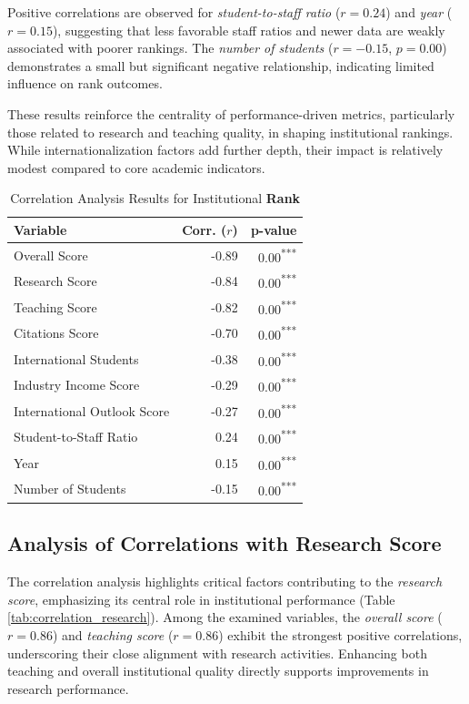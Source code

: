 \documentclass[sigconf]{acmart}
\begin{document}
Positive correlations are observed for \textit{student-to-staff ratio} ($r = 0.24$) and \textit{year} ($r = 0.15$), suggesting that less favorable staff ratios and newer data are weakly associated with poorer rankings. The \textit{number of students} ($r = -0.15$, $p = 0.00$) demonstrates a small but significant negative relationship, indicating limited influence on rank outcomes.

These results reinforce the centrality of performance-driven metrics, particularly those related to research and teaching quality, in shaping institutional rankings. While internationalization factors add further depth, their impact is relatively modest compared to core academic indicators.

\begin{table}[h!]
	\centering
	\caption{Correlation Analysis Results for Institutional \textbf{Rank}}
	\label{tab:correlation_rank}
	\begin{tabular}{|l|r|r|}
		\hline
		\textbf{Variable} & \textbf{Corr. ($r$)} & \textbf{p-value} \\
		\hline
		Overall Score & -0.89 & 0.00\textsuperscript{***} \\
		Research Score & -0.84 & 0.00\textsuperscript{***} \\
		Teaching Score & -0.82 & 0.00\textsuperscript{***} \\
		Citations Score & -0.70 & 0.00\textsuperscript{***} \\
		International Students & -0.38 & 0.00\textsuperscript{***} \\
		Industry Income Score & -0.29 & 0.00\textsuperscript{***} \\
		International Outlook Score & -0.27 & 0.00\textsuperscript{***} \\
		Student-to-Staff Ratio & 0.24 & 0.00\textsuperscript{***} \\
		Year & 0.15 & 0.00\textsuperscript{***} \\
		Number of Students & -0.15 & 0.00\textsuperscript{***} \\
		\hline
	\end{tabular}
\end{table}


\subsection{Analysis of Correlations with Research Score}

The correlation analysis highlights critical factors contributing to the \textit{research score}, emphasizing its central role in institutional performance (Table \ref{tab:correlation_research}). Among the examined variables, the \textit{overall score} ($r = 0.86$) and \textit{teaching score} ($r = 0.86$) exhibit the strongest positive correlations, underscoring their close alignment with research activities. Enhancing both teaching and overall institutional quality directly supports improvements in research performance.
\end{document}
